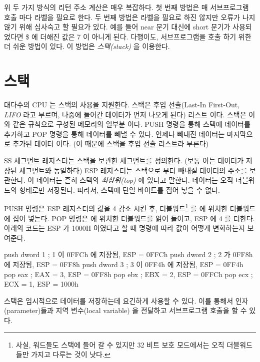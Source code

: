 위 두 가지 방식의 리턴 주소 계산은 매우 복잡하다. 첫 번째 방법은 매 서브프로그램 호출
마다 라벨을 필요로 한다. 두 번째 방법은 라벨을 필요로 하진 않지만 오류가 나지 않기
위해 심사숙고 할 필요가 있다. 예를 들어 near 분기 대신에 short 분기가 사용되었다면 
{\code \$} 에 더해진 값은 7 이 아니게 된다. 다행이도, 서브프로그램을 호출 하기 위한
더 쉬운 방법이 있다. 이 방법은 \emph{스택(stack)} 을 이용한다. 

\section{스택}

대다수의 CPU 는 스택의 사용을 지원한다. 스택은 후입 선출(Last-In First-Out,
\emph{LIFO} 라고 부르며, 나중에 들어간 데이터가 먼저 나오게 된다) 리스트 이다.
스택은 이와 같은 규칙으로 구성된 메모리의 일부분 이다. {\code PUSH} 명령을 통해
스택에 데이터를 추가하고 {\code POP} 명령을 통해 데이터를 빼낼 수 있다. 
언제나 빼내진 데이터는 마지막으로 추가된 데이터 이다. (이 때문에 스택을 
후입 선출 리스트라 부른다)

SS 세그먼트 레지스터는 스택을 보관한 세그먼트를 정의한다. (보통 이는 
데이터가 저장된 세그먼트와 동일하다) ESP 레지스터는 스택으로 부터 빼내질
데이터의 주소를 보관한다. 이 데이터는 흔히 스택의 \emph{최상위(top)} 에 있다고
말한다. 데이터는 오직 더블워드의 형태로만 저장된다. 따라서, 스택에 단일
바이트를 집어 넣을 수 없다. 

{\code PUSH} 명령은 ESP 레지스터의 값을 4 감소 시킨 후, 더블워드\footnote{사실, 워드들도 스택에
들어 갈 수 있지만 32 비트 보호 모드에서는 오직 더블워드들만 가지고 다루는
것이 낫다.} 를 {\code [ESP]} 에 위치한 더블워드에 집어 넣는다. {\code POP} 명령은
{\code [ESP]} 에 위치한 더블워드를 읽어 들이고, ESP 에 4 를 더한다. 아래의 코드는 
ESP 가 {\code 1000H} 이였다고 할 때 명령에 따라 값이 어떻게 변화하는지 보여준다. 

\begin{AsmCodeListing}[frame=none]
      push   dword 1    ; 1 이 0FFCh 에 저장됨, ESP = 0FFCh
      push   dword 2    ; 2 가 0FF8h 에 저장됨, ESP = 0FF8h
      push   dword 3    ; 3 이 0FF4h 에 저장됨, ESP = 0FF4h
      pop    eax        ; EAX = 3, ESP = 0FF8h
      pop    ebx        ; EBX = 2, ESP = 0FFCh
      pop    ecx        ; ECX = 1, ESP = 1000h
\end{AsmCodeListing}

스택은 임시적으로 데이터를 저장하는데 요긴하게 사용할 수 있다. 이를 통해서
인자(parameter)들과 지역 변수(local variable) 을 전달하고 
서브프로그램 호출을 할 수 있다. 

